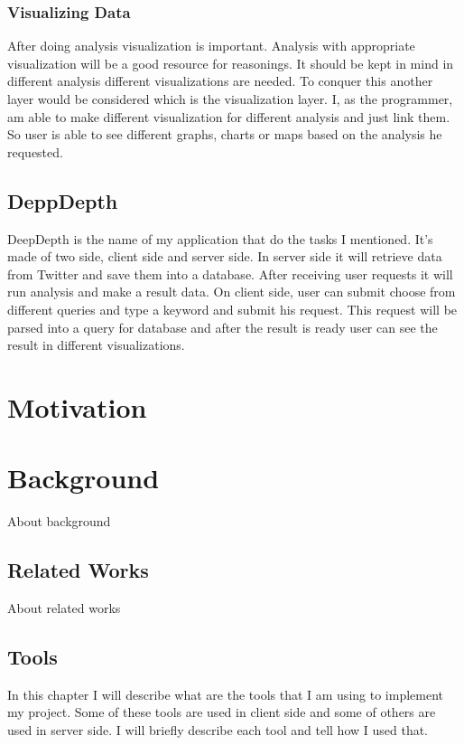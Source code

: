 \documentclass[a4paper,11pt]{report}
\begin{document}
\subsection{Visualizing Data}
After doing analysis visualization is important. Analysis with appropriate visualization will be a good resource for reasonings. It should be kept in mind in different analysis different visualizations are needed. To conquer this another layer would be considered which is the visualization layer. I, as the programmer, am able to make different visualization for different analysis and just link them. So user is able to see different graphs, charts or maps based on the analysis he requested.

\section{DeppDepth}
DeepDepth is the name of my application that do the tasks I mentioned. It's made of two side, client side and server side. In server side it will retrieve data from Twitter and save them into a database. After receiving user requests it will run analysis and make a result data. On client side, user can submit choose from different queries and type a keyword and submit his request. This request will be parsed into a query for database and after the result is ready user can see the result in different visualizations.

\chapter{Motivation}

\chapter{Background}
About background

\section{Related Works}
About related works


\section{Tools}
In this chapter I will describe what are the tools that I am using to implement my project. Some of these tools are used in client side and some of others are used in server side. I will briefly describe each tool and tell how I used that.
\end{document}
